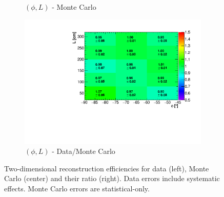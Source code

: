 \documentclass[a4paper,11pt]{article}
\begin{document}
\begin{figure}[htbp]
\begin{subfigure}{0.33\textwidth}
\caption{$(\phi,L)$ - Monte Carlo}
\end{subfigure}\begin{subfigure}{0.33\textwidth}
\includegraphics[width=\linewidth]{figures/phi_l.pdf}
\caption{$(\phi,L)$ - Data/Monte Carlo}
\end{subfigure}
\caption{Two-dimensional reconstruction efficiencies for data (left), Monte Carlo (center) and their ratio (right). Data errors include systematic effects. Monte Carlo errors are statistical-only.}\label{fig:2d}
\end{figure}
\end{document}
